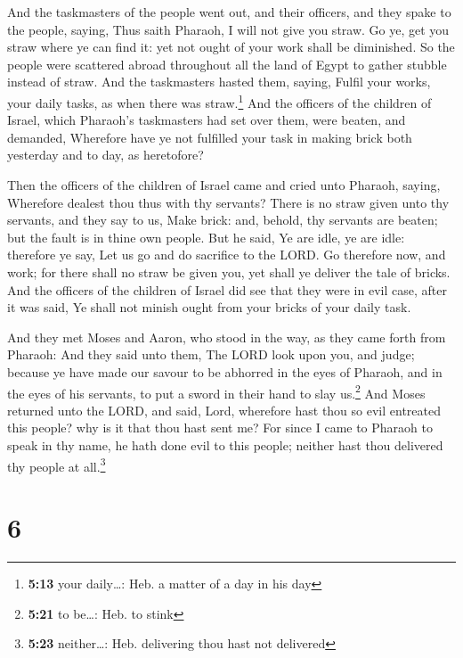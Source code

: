 And the taskmasters of the people went out, and their
officers, and they spake to the people, saying, Thus saith Pharaoh, I
will not give you straw.  Go ye, get you straw where ye
can find it: yet not ought of your work shall be diminished.
 So the people were scattered abroad throughout all the
land of Egypt to gather stubble instead of straw.  And
the taskmasters hasted them, saying, Fulfil your works, your daily
tasks, as when there was straw.\footnote{\textbf{5:13} your daily\ldots:
  Heb. a matter of a day in his day}  And the officers of
the children of Israel, which Pharaoh's taskmasters had set over them,
were beaten, and demanded, Wherefore have ye not fulfilled your task in
making brick both yesterday and to day, as heretofore?

 Then the officers of the children of Israel came and
cried unto Pharaoh, saying, Wherefore dealest thou thus with thy
servants?  There is no straw given unto thy servants, and
they say to us, Make brick: and, behold, thy servants are beaten; but
the fault is in thine own people.  But he said, Ye are
idle, ye are idle: therefore ye say, Let us go and do sacrifice to the
LORD.  Go therefore now, and work; for there shall no
straw be given you, yet shall ye deliver the tale of bricks.
 And the officers of the children of Israel did see that
they were in evil case, after it was said, Ye shall not minish ought
from your bricks of your daily task.

 And they met Moses and Aaron, who stood in the way, as
they came forth from Pharaoh:  And they said unto them,
The LORD look upon you, and judge; because ye have made our savour to be
abhorred in the eyes of Pharaoh, and in the eyes of his servants, to put
a sword in their hand to slay us.\footnote{\textbf{5:21} to be\ldots:
  Heb. to stink}  And Moses returned unto the LORD, and
said, Lord, wherefore hast thou so evil entreated this people? why is it
that thou hast sent me?  For since I came to Pharaoh to
speak in thy name, he hath done evil to this people; neither hast thou
delivered thy people at all.\footnote{\textbf{5:23} neither\ldots: Heb.
  delivering thou hast not delivered}

\hypertarget{section-5}{%
\section{6}\label{section-5}}


